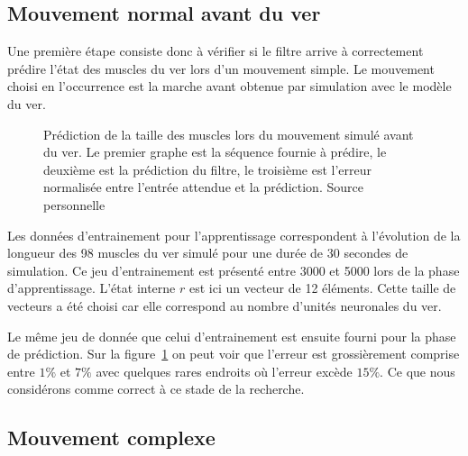 \subsection{Mouvement normal avant du ver} %
\label{sub:Mouvement normal avant du ver}

Une première étape consiste donc à vérifier si le filtre arrive à correctement
prédire l'état des muscles du ver lors d'un mouvement simple. Le mouvement
choisi en l'occurrence est la marche avant obtenue par simulation avec le
modèle du ver.

\begin{figure}[ht]
   \begin{center}
   \end{center}
   \caption[Prédiction de la taille des muscles lors du mouvement simulé
   avant du ver]{Prédiction de la taille des muscles lors du mouvement simulé
   avant du ver. Le premier graphe est la séquence fournie à prédire, le
   deuxième est la prédiction du filtre, le troisième est l'erreur normalisée
   entre l'entrée attendue et la prédiction. Source personnelle}
   \label{fig:sequence_ver_complet}
\end{figure}

Les données d'entrainement pour l'apprentissage correspondent à l'évolution de
la longueur des 98 muscles du ver simulé pour une durée de 30 secondes de
simulation. Ce jeu d'entrainement est présenté entre 3000 et 5000 lors de la
phase d'apprentissage. L'état interne $r$ est ici un vecteur de 12 éléments.
Cette taille de vecteurs a été choisi car elle correspond au nombre d'unités
neuronales du ver.

Le même jeu de donnée que celui d'entrainement est ensuite fourni pour la phase
de prédiction. Sur la figure~\ref{fig:sequence_ver_complet} on peut voir que l'erreur
est grossièrement comprise entre $1\%$ et $7\%$ avec quelques rares endroits où l'erreur
excède $15\%$. Ce que nous considérons comme correct à ce stade de la recherche.


\subsection{Mouvement complexe} %
\label{sub:Mouvement complexe}

